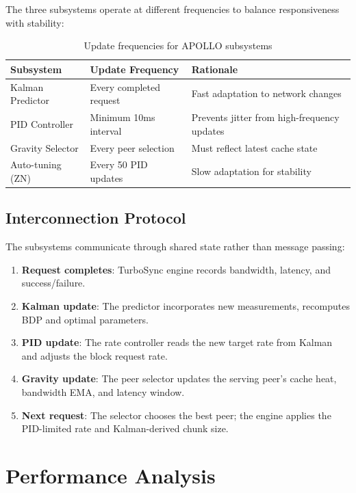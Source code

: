 \documentclass[11pt,a4paper]{article}
\begin{document}
The three subsystems operate at different frequencies to balance responsiveness with stability:

\begin{table}[h]
\centering
\begin{tabular}{lll}
\toprule
\textbf{Subsystem} & \textbf{Update Frequency} & \textbf{Rationale} \\
\midrule
Kalman Predictor & Every completed request & Fast adaptation to network changes \\
PID Controller & Minimum 10ms interval & Prevents jitter from high-frequency updates \\
Gravity Selector & Every peer selection & Must reflect latest cache state \\
Auto-tuning (ZN) & Every 50 PID updates & Slow adaptation for stability \\
\bottomrule
\end{tabular}
\caption{Update frequencies for APOLLO subsystems}
\label{tab:update_freq}
\end{table}

\subsection{Interconnection Protocol}

The subsystems communicate through shared state rather than message passing:

\begin{enumerate}
    \item \textbf{Request completes}: TurboSync engine records bandwidth, latency, and success/failure.
    \item \textbf{Kalman update}: The predictor incorporates new measurements, recomputes BDP and optimal parameters.
    \item \textbf{PID update}: The rate controller reads the new target rate from Kalman and adjusts the block request rate.
    \item \textbf{Gravity update}: The peer selector updates the serving peer's cache heat, bandwidth EMA, and latency window.
    \item \textbf{Next request}: The selector chooses the best peer; the engine applies the PID-limited rate and Kalman-derived chunk size.
\end{enumerate}

\section{Performance Analysis}
\label{sec:performance}
\end{document}

